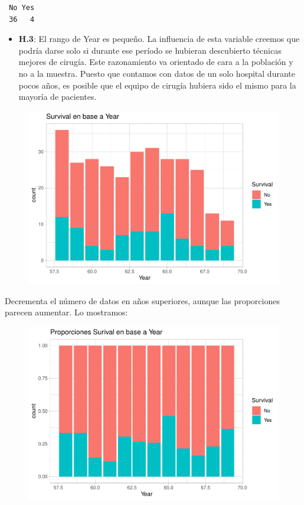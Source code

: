\begin{verbatim}
 No Yes 
 36   4 
\end{verbatim}

\begin{itemize}
    \item \textbf{H.3}: El rango de Year es pequeño. La influencia de esta variable creemos que podría darse solo si durante ese período se hubieran descubierto técnicas mejores de cirugía. Este razonamiento va orientado de cara a la población y no a la muestra. Puesto que contamos con datos de un solo hospital durante pocos años, es posible que el equipo de cirugía hubiera sido el mismo para la mayoría de pacientes.
\end{itemize}

\begin{figure}[H]\includegraphics[width=.9\linewidth]{img/EDA2_files/figure-latex/unnamed-chunk-35-1} \end{figure}

Decrementa el número de datos en años superiores, aunque las proporciones parecen aumentar. Lo mostramos:

\begin{figure}[H]\includegraphics[width=.9\linewidth]{img/EDA2_files/figure-latex/unnamed-chunk-36-1} \end{figure}

